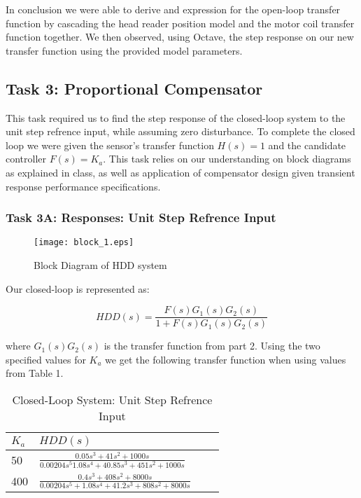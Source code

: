 \documentclass{article}
\begin{document}
In conclusion we were able to derive and expression for the open-loop
transfer function by cascading the head reader position model and the
motor coil transfer function together. We then observed, using Octave,
the step response on our new transfer function using the provided
model parameters.

\subsection*{Task 3: Proportional Compensator}

This task required us to find the step response of the closed-loop system to
the unit step refrence input, while assuming zero disturbance. To complete the
closed loop we were given the sensor's transfer function $H(s) = 1$ and the
candidate controller $F(s) = K_a$. This task relies on our understanding on
block diagrams as explained in class, as well as application of compensator
design given transient response performance specifications.

\subsubsection*{Task 3A: Responses: Unit Step Refrence Input}

\begin{figure}[H]
  \centering
  \caption{Block Diagram of HDD system}
  \texttt{[image: block\_1.eps]}
\end{figure}


Our closed-loop is represented as: 

$$HDD(s) = \frac{F(s)G_1(s)G_2(s)}{1 + F(s)G_1(s)G_2(s)}$$

\noindent
where $G_1(s)G_2(s)$ is the transfer function from part 2. Using the two
specified values for $K_a$ we get the following transfer function when using
values from Table 1.

\begin{table}[H]
\begin{center}
  \begin{tabular}{ | l | l | l | p{5cm} |}
  \hline
  \textbf{$K_a$} & \textbf{$HDD(s)$}  \\ \hline
  50 & $\frac{0.05s^3 + 41s^2 + 1000s}{0.00204s^5 1.08s^4 + 40.85 s^3 
  + 451 s^2  + 1000s}$\\ \hline 
  400 & $\frac{0.4s^3 + 408s^2 + 8000s}{0.00204s^5 + 1.08s^4 + 41.2 s^3
  + 808 s^2 + 8000 s}$  \\ \hline
 \end{tabular}
\end{center}
\caption{Closed-Loop System: Unit Step Refrence Input}
\end{table}
\end{document}
